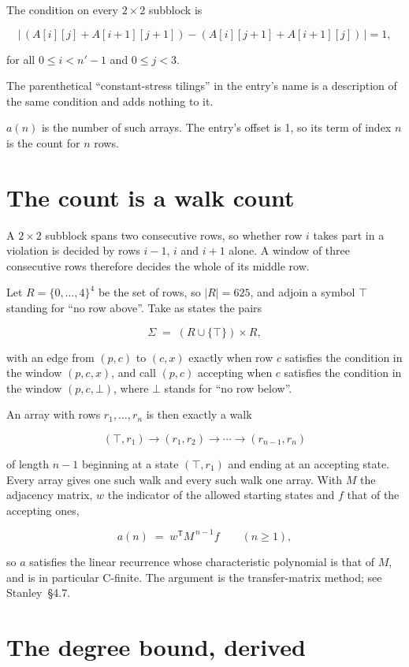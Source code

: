 \documentclass[11pt]{article}
\theoremstyle{definition}
\begin{document}
The condition on every $2 \times 2$ subblock is

\[\bigl|\,(A[i][j] + A[i{+}1][j{+}1]) - (A[i][j{+}1] + A[i{+}1][j])\,\bigr| = 1,\]

for all $0 \le i < n'-1$ and $0 \le j < 3$.

The parenthetical ``constant-stress tilings'' in the entry's name is a description of the same condition and adds nothing to it.

$a(n)$ is the number of such arrays. The entry's offset is 1, so its term of index $n$ is the count for $n$ rows.

\section{The count is a walk count}

A $2 \times 2$ subblock spans two consecutive rows, so whether row $i$ takes part in a violation is decided by rows $i-1$, $i$ and $i+1$ alone. A window of three consecutive rows therefore decides the whole of its middle row.

Let $R = \{0,\dots,4\}^{4}$ be the set of rows, so $|R| = 625$, and adjoin a symbol $\top$ standing for ``no row above''. Take as states the pairs

\[\Sigma \;=\; (R \cup \{\top\}) \times R,\]

with an edge from $(p,c)$ to $(c,x)$ exactly when row $c$ satisfies the condition in the window $(p,c,x)$, and call $(p,c)$ accepting when $c$ satisfies the condition in the window $(p,c,\bot)$, where $\bot$ stands for ``no row below''.

An array with rows $r_1,\dots,r_n$ is then exactly a walk

\[(\top,r_1) \to (r_1,r_2) \to \cdots \to (r_{n-1},r_n)\]

of length $n-1$ beginning at a state $(\top,r_1)$ and ending at an accepting state. Every array gives one such walk and every such walk one array. With $M$ the adjacency matrix, $w$ the indicator of the allowed starting states and $f$ that of the accepting ones,

\[a(n) \;=\; w^{\mathsf T} M^{\,n-1} f \qquad (n \ge 1),\]

so $a$ satisfies the linear recurrence whose characteristic polynomial is that of $M$, and is in particular C-finite. The argument is the transfer-matrix method; see Stanley~\S4.7.

\section{The degree bound, derived}
\end{document}
